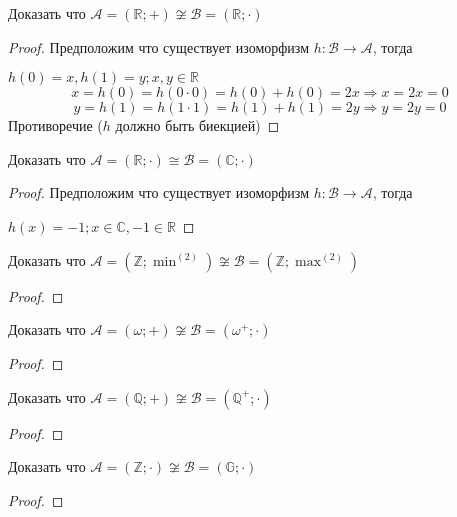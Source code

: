 \documentclass[../main/document.tex]{subfiles}
\begin{document}
\begin{exm}
Доказать что $\mathcal{A}=(\mathbb{R};+)\not\cong\mathcal{B}=(\mathbb{R};\cdot)$
\begin{proof}
Предположим что существует изоморфизм $h:\mathcal{B}\rightarrow \mathcal{A}$, тогда

$h(0)=x, h(1)=y; x,y\in \mathbb{R}$
$$x=h(0)=h(0\cdot 0)=h(0)+ h(0)=2x\Rightarrow x=2x=0$$
$$y=h(1)=h(1\cdot 1)=h(1)+ h(1)=2y\Rightarrow y=2y=0$$
Противоречие ($h$ должно быть биекцией)
\end{proof}
\end{exm}

\begin{exm}
Доказать что $\mathcal{A}=(\mathbb{R};\cdot)\cong\mathcal{B}=(\mathbb{C};\cdot)$
\begin{proof}
Предположим что существует изоморфизм $h:\mathcal{B}\rightarrow \mathcal{A}$, тогда

$h(x)=-1; x\in \mathbb{C},-1\in \mathbb{R}$

\end{proof}
\end{exm}

\begin{exm}
Доказать что $\mathcal{A}=(\mathbb{Z};{\operatorname{min}}^{(2)})\not\cong\mathcal{B}=(\mathbb{Z};{\operatorname{max}}^{(2)})$
\begin{proof}

\end{proof}
\end{exm}

\begin{exm}
Доказать что $\mathcal{A}=(\omega;+)\not\cong\mathcal{B}=(\omega^+;\cdot)$
\begin{proof}

\end{proof}
\end{exm}

\begin{exm}
Доказать что $\mathcal{A}=(\mathbb{Q};+)\not\cong\mathcal{B}=(\mathbb{Q}^+;\cdot)$
\begin{proof}

\end{proof}
\end{exm}

\begin{exm}
Доказать что $\mathcal{A}=(\mathbb{Z};\cdot)\not\cong\mathcal{B}=(\mathbb{G};\cdot)$
\begin{proof}

\end{proof}
\end{exm}
\end{document}
